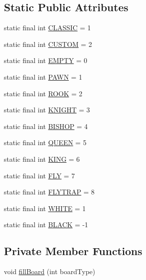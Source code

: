 \subsection*{Static Public Attributes}
\begin{DoxyCompactItemize}
\item 
static final int \hyperlink{classgame_1_1_board_ad8df367d654710a005091c644088879e}{C\-L\-A\-S\-S\-I\-C} = 1
\item 
static final int \hyperlink{classgame_1_1_board_a1bac85e381255ac84399072df7b863e9}{C\-U\-S\-T\-O\-M} = 2
\item 
static final int \hyperlink{classgame_1_1_board_a1919fd52c264639c24155b333495a11c}{E\-M\-P\-T\-Y} = 0
\item 
static final int \hyperlink{classgame_1_1_board_abeabe8126dcd677e8570991415155513}{P\-A\-W\-N} = 1
\item 
static final int \hyperlink{classgame_1_1_board_a6e93b6ff58a5e29c8067eaf569acd7d1}{R\-O\-O\-K} = 2
\item 
static final int \hyperlink{classgame_1_1_board_a805c2fa05787d3a91d4cbf34d74970f3}{K\-N\-I\-G\-H\-T} = 3
\item 
static final int \hyperlink{classgame_1_1_board_a43354b0544e528583e783c228b3016a3}{B\-I\-S\-H\-O\-P} = 4
\item 
static final int \hyperlink{classgame_1_1_board_a010790144c6c1e42d97ce588d1522184}{Q\-U\-E\-E\-N} = 5
\item 
static final int \hyperlink{classgame_1_1_board_aa90eb06edcc6b4159963daa2bb83fa37}{K\-I\-N\-G} = 6
\item 
static final int \hyperlink{classgame_1_1_board_aa68c679fcb4744729d246aba79e7613a}{F\-L\-Y} = 7
\item 
static final int \hyperlink{classgame_1_1_board_a7f0beeebc30980894df8aec277501cd5}{F\-L\-Y\-T\-R\-A\-P} = 8
\item 
static final int \hyperlink{classgame_1_1_board_ad3b4223ca4e14051a8bdd78a95b38071}{W\-H\-I\-T\-E} = 1
\item 
static final int \hyperlink{classgame_1_1_board_a6495a2020e20b656f5e82cf55cae41f0}{B\-L\-A\-C\-K} = -\/1
\end{DoxyCompactItemize}
\subsection*{Private Member Functions}
\begin{DoxyCompactItemize}
\item 
void \hyperlink{classgame_1_1_board_afdb8d18115d6485c6c428345ee14172b}{fill\-Board} (int board\-Type)
\end{DoxyCompactItemize}


